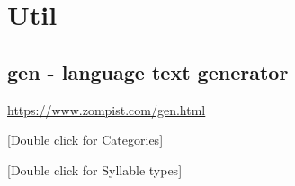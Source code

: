 \section*{Util}

\subsection{gen - language text generator}
\url{https://www.zompist.com/gen.html}

{[}Double click for Categories{]}
\iffalse
C=šždkgszpbtčjywcżmnñ
V=iueoa
N=nñm
S=šs
P=bdg
\fi

{[}Double click for Syllable types{]}
\iffalse
CV
SPV
CVN
SPVN
\fi